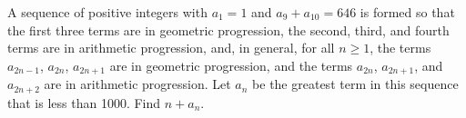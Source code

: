 A sequence of positive integers with $a_1=1$ and $a_9+a_{10}=646$ is formed so that the first three terms are in geometric progression, the second, third, and fourth terms are in arithmetic progression, and, in general, for all $n\ge1$, the terms $a_{2n-1}$, $a_{2n}$, $a_{2n+1}$ are in geometric progression, and the terms $a_{2n}$, $a_{2n+1}$, and $a_{2n+2}$ are in arithmetic progression. Let $a_n$ be the greatest term in this sequence that is less than 1000. Find $n+a_n$.